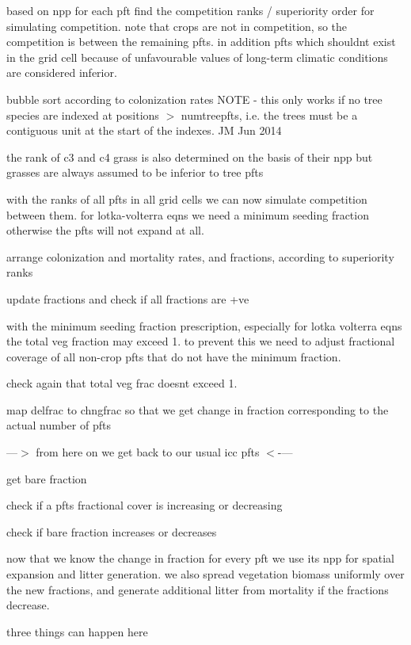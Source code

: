 based on npp for each pft find the competition ranks / superiority order for simulating competition. note that crops are not in competition, so the competition is between the remaining pfts. in addition pfts which shouldn\textquotesingle{}t exist in the grid cell because of unfavourable values of long-\/term climatic conditions are considered inferior.

bubble sort according to colonization rates N\+O\+T\+E -\/ this only works if no tree species are indexed at positions $>$ numtreepfts, i.\+e. the trees must be a contiguous unit at the start of the indexes. J\+M Jun 2014

the rank of c3 and c4 grass is also determined on the basis of their npp but grasses are always assumed to be inferior to tree pfts

with the ranks of all pfts in all grid cells we can now simulate competition between them. for lotka-\/volterra eqns we need a minimum seeding fraction otherwise the pfts will not expand at all.

arrange colonization and mortality rates, and fractions, according to superiority ranks

update fractions and check if all fractions are +ve

with the minimum seeding fraction prescription, especially for lotka volterra eqns the total veg fraction may exceed 1. to prevent this we need to adjust fractional coverage of all non-\/crop pfts that do not have the minimum fraction.

check again that total veg frac doesn\textquotesingle{}t exceed 1.

map delfrac to chngfrac so that we get change in fraction corresponding to the actual number of pfts

---$>$ from here on we get back to our usual icc pfts $<$-\/---

get bare fraction

check if a pft\textquotesingle{}s fractional cover is increasing or decreasing

check if bare fraction increases or decreases

now that we know the change in fraction for every pft we use its npp for spatial expansion and litter generation. we also spread vegetation biomass uniformly over the new fractions, and generate additional litter from mortality if the fractions decrease.

three things can happen here


